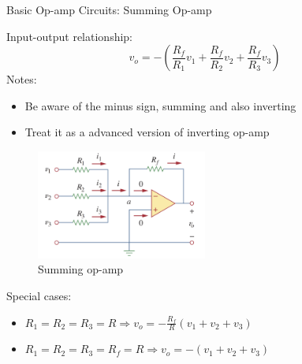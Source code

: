 \documentclass{beamer}
\begin{document}
\begin{frame}{Basic Op-amp Circuits: Summing Op-amp}

\begin{multicols}{2}
    \sectiont{}
    Input-output relationship:
    $$v_o = -(\frac{R_f}{R_1}v_1 + \frac{R_f}{R_2}v_2 + \frac{R_f}{R_3}v_3)$$
    Notes:
    \begin{itemize}
        \item Be aware of the minus sign, summing and also inverting
        \item Treat it as a advanced version of inverting op-amp
    \end{itemize}
    
    \sectiont{}
    \begin{figure}[H]
        \centering
        \includegraphics[width=0.5\textwidth]{img_opamp/8_adder.png}
        \caption{Summing op-amp}
    \end{figure}
\end{multicols}

Special cases:
\begin{itemize}
    \item $R_1 = R_2 = R_3 = R \Rightarrow v_o = -\frac{R_f}{R}(v_1+v_2+v_3)$
    \item $R_1=R_2=R_3=R_f=R \Rightarrow v_o = -(v_1+v_2+v_3)$
\end{itemize}
    
\end{frame}
\end{document}
